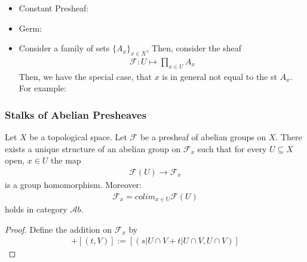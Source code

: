\documentclass[Total.tex]{subfiles}
\begin{document}
					\begin{example}
						\begin{itemize}
							\item Constant Presheaf:
							\item Germ:
							\item Consider a family of sets $\{A_x\}_{x\in X}$, Then, consider the sheaf
							\begin{gather*}
								\mathcal{F}:U\mapsto \prod_{x\in U} A_x
							\end{gather*}
							Then, we have the special case, that $x$ is in general not equal to the st $A_x$. For example:
						\end{itemize}
					\end{example}
				\subsubsection{Stalks of Abelian Presheaves}
				\begin{lemma}
					Let $X$ be a topological space. Let $\mathcal{F}$ be a presheaf of abelian groups on $X$. There exists a unique structure of an abelian group on $\mathcal{F}_x$ such that for every $U\subseteq X$ open, $x\in U$ the map
					\begin{gather*}
						\mathcal{F}(U)\rightarrow \mathcal{F}_x
					\end{gather*}
					is a group homomorphism. Moreover:
					\begin{gather*}
						\mathcal{F}_x=colim_{x\in U} \mathcal{F}(U)
					\end{gather*}
					holds in category $\mathcal Ab$.
					\end{lemma}
				\begin{proof}
					Define the addition on $\mathcal{F}_x$ by
					\begin{gather*}
						[(s,U)]+[(t,V)]:=[(s|U\cap V+t|U\cap V,U\cap V)]
					\end{gather*}
				\end{proof}
\end{document}
